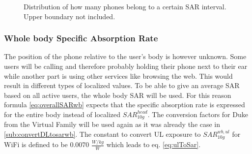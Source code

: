 

\begin{figure}
  \caption{Distribution of how many phones belong to a certain SAR interval. Upper boundary not included.}
  \label{chart:germanDatabase}
\end{figure}


\subsubsection{Whole body Specific Absorption Rate}
The position of the phone relative to the user's body is however unknown. 
Some users will be calling and therefore probably holding their phone next to their ear while another part is using other services like browsing the web. 
This would result in different types of localized values. To be able to give an average SAR based on all active users, the whole body SAR will be used.
For this reason formula \ref{eq:overallSARwb} expects that the specific absorption rate is expressed for the entire body instead of localized $SAR^{head}_{10g}$.
The conversion factors for Duke from the Virtual Family will be used again as it was already the case in \ref{sub:convertDLtosarwb}. 
The constant to convert \gls{UL} exposure to $SAR^{wb,ul}_{10g}$
for WiFi is defined to be 0.0070 $\frac{W/kg}{W}$ \cite{J22_plets2015joint} which leads to eq. \ref{eq:ulToSar}.

